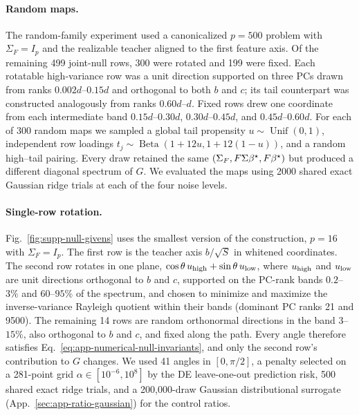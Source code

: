 \paragraph{Random maps.}
The random-family experiment used a canonicalized $p=500$ problem with
$\Sigma_F=I_p$ and the realizable teacher aligned to the first feature axis.
Of the remaining 499 joint-null rows, 300 were rotated and 199 were fixed.
Each rotatable high-variance row was a unit direction supported on three PCs
drawn from ranks $0.002d$--$0.15d$ and orthogonal to both $b$ and $c$; its
tail counterpart was constructed analogously from ranks $0.60d$--$d$.  Fixed
rows drew one coordinate from each intermediate band $0.15d$--$0.30d$,
$0.30d$--$0.45d$, and $0.45d$--$0.60d$.  For each of 300 random maps we
sampled a global tail propensity $u\sim\operatorname{Unif}(0,1)$, independent
row loadings $t_j\sim\operatorname{Beta}(1+12u,1+12(1-u))$, and a random
high--tail pairing.  Every draw retained the same
$(\Sigma_F,F\Sigma{\beta^{\star}},F{\beta^{\star}})$ but produced a different diagonal spectrum
of $G$.  We evaluated the maps using 2000 shared exact Gaussian ridge trials
at each of the four noise levels.

\paragraph{Single-row rotation.}
Fig.~\ref{fig:supp-null-givens} uses the smallest version of the
construction, $p=16$ with $\Sigma_F=I_p$.  The first row is the teacher axis
$b/\sqrt S$ in whitened coordinates.  The second row rotates in one plane,
$\cos\theta\,u_{\rm high}+\sin\theta\,u_{\rm low}$, where $u_{\rm high}$ and
$u_{\rm low}$ are unit directions orthogonal to $b$ and $c$, supported on the
PC-rank bands $0.2$--$3\%$ and $60$--$95\%$ of the spectrum, and chosen to
minimize and maximize the inverse-variance Rayleigh quotient within their
bands (dominant PC ranks 21 and 9500).  The remaining 14 rows are random
orthonormal directions in the band $3$--$15\%$, also orthogonal to $b$ and
$c$, and fixed along the path.  Every angle therefore satisfies
Eq.~\ref{eq:app-numerical-null-invariants}, and only the second row's
contribution to $G$ changes.  We used 41 angles in $[0,\pi/2]$, a penalty
selected on a 281-point grid $\alpha\in[10^{-6},10^{8}]$ by the DE
leave-one-out prediction risk, 500 shared exact ridge trials, and a
200,000-draw Gaussian distributional surrogate
(App.~\ref{sec:app-ratio-gaussian}) for the control ratios.

